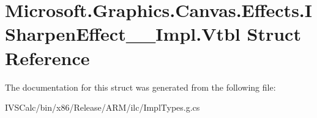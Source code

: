\hypertarget{struct_microsoft_1_1_graphics_1_1_canvas_1_1_effects_1_1_i_sharpen_effect_____impl_1_1_vtbl}{}\section{Microsoft.\+Graphics.\+Canvas.\+Effects.\+I\+Sharpen\+Effect\+\_\+\+\_\+\+Impl.\+Vtbl Struct Reference}
\label{struct_microsoft_1_1_graphics_1_1_canvas_1_1_effects_1_1_i_sharpen_effect_____impl_1_1_vtbl}


The documentation for this struct was generated from the following file\+:\begin{DoxyCompactItemize}
\item 
I\+V\+S\+Calc/bin/x86/\+Release/\+A\+R\+M/ilc/Impl\+Types.\+g.\+cs\end{DoxyCompactItemize}
